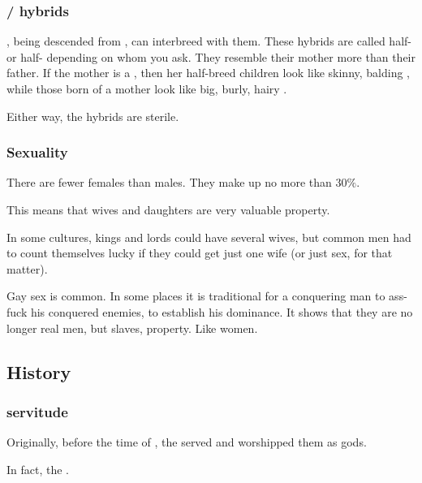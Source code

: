 \subsubsection{\Nephil/\human{} hybrids}
\Humans, being descended from \nephilim, can interbreed with them. 
These hybrids are called half-\humans{} or half-\nephilim{} depending on whom you ask. 
They resemble their mother more than their father. 
If the mother is a \nephil, then her half-breed children look like skinny, balding \nephilim{}, while those born of a \human{} mother look like big, burly, hairy \humans. 

Either way, the hybrids are sterile. 





\subsubsection{Sexuality}
There are fewer \nephilic{} females than males. 
They make up no more than $30\%$. 

This means that wives and daughters are very valuable property. 

In some cultures, kings and lords could have several wives, but common men had to count themselves lucky if they could get just one wife (or just sex, for that matter). 

Gay sex is common. 
In some places it is traditional for a conquering man to ass-fuck his conquered enemies, to establish his dominance. 
It shows that they are no longer real men, but slaves, property. 
Like women. 









\subsection{History}
\subsubsection{\Ophidian{} servitude}
Originally, before the time of \Kserasshana, the \nephilim{} served  \ophidians{} and worshipped them as gods. 

In fact, the \ophidians{} . 





